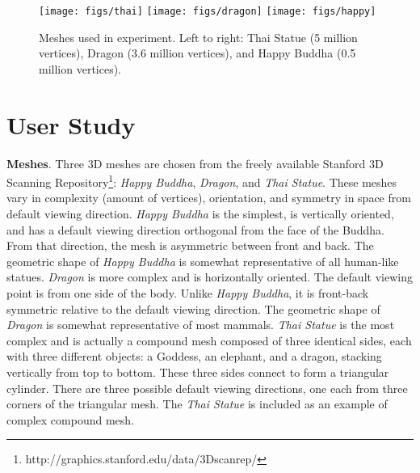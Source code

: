 %

\begin{figure}[htp]
\centering
\texttt{[image: figs/thai]}
\texttt{[image: figs/dragon]}
\texttt{[image: figs/happy]} 
\caption{Meshes used in experiment.  Left to right: 
Thai Statue (5 million vertices), Dragon (3.6 million vertices), and Happy Buddha (0.5 million vertices).}
\label{fig:3dmodels}
\end{figure}

\section{User Study}

\textbf{Meshes}. Three 3D meshes are chosen from the freely available
Stanford 3D Scanning Repository\footnote{http://graphics.stanford.edu/data/3Dscanrep/}: \textit{Happy Buddha}, \textit{Dragon}, and \textit{Thai Statue}.
These meshes vary in complexity (amount of vertices), orientation, and
symmetry in space from default viewing direction. \textit{Happy Buddha} is the
simplest, is vertically oriented, and has a default viewing direction
orthogonal from the face of the Buddha. From that direction, the mesh is
asymmetric between front and back. The geometric shape of \textit{Happy Buddha} is
somewhat representative of all human-like statues. \textit{Dragon} is more complex
and is horizontally oriented. The default viewing point is from one
side of the body. Unlike \textit{Happy Buddha}, it is front-back symmetric
relative to the default viewing direction. The geometric shape of \textit{Dragon} is
somewhat representative of most mammals. \textit{Thai Statue} is the most complex
and is actually a compound mesh composed of three identical sides, each 
with three different objects: a Goddess, an elephant, and a dragon,
stacking vertically from top to bottom.  These three sides connect to
form a triangular cylinder. There are three possible default
viewing directions, one each from three corners of the triangular mesh. The
\textit{Thai Statue} is included as an example of complex compound mesh.

